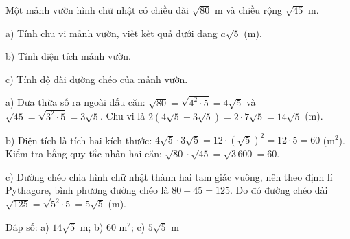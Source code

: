 \begin{problem}[9DS-CAN-038]
Một mảnh vườn hình chữ nhật có chiều dài $\sqrt{80}$ m và chiều rộng $\sqrt{45}$ m.

a) Tính chu vi mảnh vườn, viết kết quả dưới dạng $a\sqrt{5}$ (m).

b) Tính diện tích mảnh vườn.

c) Tính độ dài đường chéo của mảnh vườn.

\begin{solution}
a) Đưa thừa số ra ngoài dấu căn: $\sqrt{80} = \sqrt{4^2 \cdot 5} = 4\sqrt{5}$ và $\sqrt{45} = \sqrt{3^2 \cdot 5} = 3\sqrt{5}$. Chu vi là $2(4\sqrt{5} + 3\sqrt{5}) = 2 \cdot 7\sqrt{5} = 14\sqrt{5}$ (m).

b) Diện tích là tích hai kích thước: $4\sqrt{5} \cdot 3\sqrt{5} = 12 \cdot (\sqrt{5})^2 = 12 \cdot 5 = 60$ (m$^2$). Kiểm tra bằng quy tắc nhân hai căn: $\sqrt{80} \cdot \sqrt{45} = \sqrt{3\,600} = 60$.

c) Đường chéo chia hình chữ nhật thành hai tam giác vuông, nên theo định lí Pythagore, bình phương đường chéo là $80 + 45 = 125$. Do đó đường chéo dài $\sqrt{125} = \sqrt{5^2 \cdot 5} = 5\sqrt{5}$ (m).

Đáp số: a) $\boxed{14\sqrt{5} \text{ m}}$; b) $\boxed{60 \text{ m}^2}$; c) $\boxed{5\sqrt{5} \text{ m}}$
\end{solution}
\end{problem}

